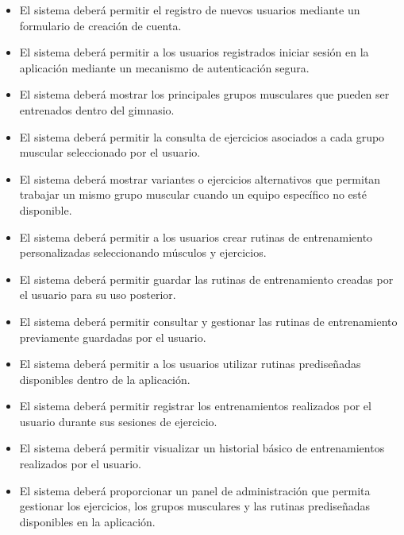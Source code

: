 \begin{itemize}
    \item El sistema deberá permitir el registro de nuevos usuarios mediante un formulario de creación de cuenta.
    
    \item El sistema deberá permitir a los usuarios registrados iniciar sesión en la aplicación mediante un mecanismo de autenticación segura.
    
    \item El sistema deberá mostrar los principales grupos musculares que pueden ser entrenados dentro del gimnasio.
    
    \item El sistema deberá permitir la consulta de ejercicios asociados a cada grupo muscular seleccionado por el usuario.
    
    \item El sistema deberá mostrar variantes o ejercicios alternativos que permitan trabajar un mismo grupo muscular cuando un equipo específico no esté disponible.
    
    \item El sistema deberá permitir a los usuarios crear rutinas de entrenamiento personalizadas seleccionando músculos y ejercicios.
    
    \item El sistema deberá permitir guardar las rutinas de entrenamiento creadas por el usuario para su uso posterior.
    
    \item El sistema deberá permitir consultar y gestionar las rutinas de entrenamiento previamente guardadas por el usuario.
    
    \item El sistema deberá permitir a los usuarios utilizar rutinas prediseñadas disponibles dentro de la aplicación.
    
    \item El sistema deberá permitir registrar los entrenamientos realizados por el usuario durante sus sesiones de ejercicio.
    
    \item El sistema deberá permitir visualizar un historial básico de entrenamientos realizados por el usuario.
    
    \item El sistema deberá proporcionar un panel de administración que permita gestionar los ejercicios, los grupos musculares y las rutinas prediseñadas disponibles en la aplicación.
\end{itemize}


